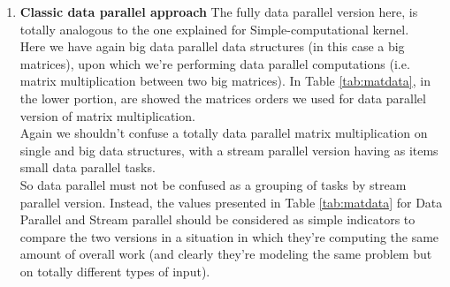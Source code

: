 \begin{enumerate}
	\item \textbf{Classic data parallel approach}
	The fully data parallel version here, is totally analogous to the one explained for Simple-computational kernel.\\
	Here we have again big data parallel data structures (in this case a big matrices), upon which we're performing data parallel computations (i.e. matrix multiplication between two big matrices).
	In Table \ref{tab:matdata}, in the lower portion, are showed the matrices orders we used for data parallel version of matrix multiplication. \\
	Again we shouldn't confuse a totally data parallel matrix multiplication on single and big data structures, with a stream parallel version having as items small data parallel tasks.\\
	So data parallel must not be confused as a grouping of tasks by stream parallel version.
	Instead, the values presented in Table \ref{tab:matdata} for Data Parallel and Stream parallel should be considered as simple indicators to compare the two versions in a situation in which they're computing the same amount of overall work (and clearly they're modeling the same problem but on totally different types of input).
	
	
	
	
	
	
	
	
	

\end{enumerate}

